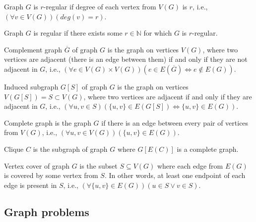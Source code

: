\begin{definition}
    Graph $G$ is $r$-regular if degree of each vertex from $V(G)$ is $r$, i.e., $(\forall v \in V(G))(deg(v) = r)$.
\end{definition}

\begin{definition}
    Graph $G$ is regular if there exists some $r \in \mathbb{N}$ for which $G$ is $r$-regular.
\end{definition}

\begin{definition}
    Complement graph $\overline{G}$ of graph $G$ is the graph on vertices $V(G)$,
    where two vertices are adjacent (there is an edge between them) if and only if
    they are not adjacent in $G$, i.e., $(\forall e \in V(G) \times V(G))(e \in E(\overline{G}) \Leftrightarrow e \notin E(G))$.
\end{definition}

\begin{definition}
    Induced subgraph $G[S]$ of graph $G$ is the graph on vertices $V(G[S]) = S \subset V(G)$,
    where two vertices are adjacent if and only if they are adjacent in $G$, i.e.,
    $(\forall u,v \in S)(\{u,v\} \in E(G[S]) \Leftrightarrow \{u,v\} \in E(G))$.
\end{definition}

\begin{definition}
    Complete graph is the graph $G$ if there is an edge between every pair of vertices from $V(G)$, i.e.,
    $(\forall u,v \in V(G))(\{u,v\} \in E(G))$.
\end{definition}

\begin{definition}[Clique]
    Clique $C$ is the subgraph of graph $G$ where $G[E(C)]$ is a complete graph.
\end{definition}

\begin{definition}
    Vertex cover of graph $G$ is the subset $S \subseteq V(G)$ where each edge from $E(G)$ is
    covered by some vertex from $S$. In other words, at least one endpoint of each edge is present in $S$, i.e.,
    $(\forall \{u,v\} \in E(G))(u \in S \vee v \in S)$.
\end{definition}


\subsection{Graph problems}

